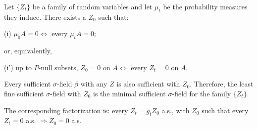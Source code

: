 Let $\{Z_t\}$ be a family of random variables and let $\mu_t$ be the probability measures they induce. There exists a $Z_0$ such that:

(i) $\mu_0 A = 0 \iff$ every $\mu_t A = 0$;

or, equivalently,

(i') up to $P$-null subsets, $Z_0 = 0$ on $A \iff$ every $Z_t = 0$ on $A$.

Every sufficient $\sigma$-field $\beta$ with any $Z$ is also sufficient with $Z_0$. Therefore, the least fine sufficient $\sigma$-field with $Z_0$ is the minimal sufficient $\sigma$-field for the family $\{Z_t\}$.

The corresponding factorization is: every $Z_t = g_t Z_0$ a.s., with $Z_0$ such that every $Z_t = 0$ a.s. $\Rightarrow Z_0 = 0$ a.s.

